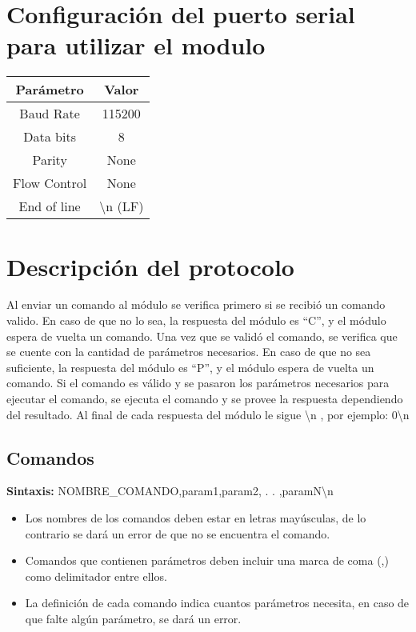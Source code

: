 \documentclass[a4paper,spanish]{article}
\title{}
\author{}
\begin{document}
\maketitle

\tableofcontents

\section{Configuración del puerto serial para utilizar el modulo}
\begin{table}[H]
	\centering
	\begin{tabular}{|c|c|}
		\hline 
		\textbf{Parámetro} & \textbf{Valor}\\ 
		\hline 
		Baud Rate & 115200\\ 
		\hline 
		Data bits & 8\\ 
		\hline 
		Parity & None \\ 
		\hline 
		Flow Control & None  \\ 
		\hline 
		End of line & \textbackslash n (LF)  \\ 
		\hline 
	\end{tabular} 
\end{table}

\section{Descripción del protocolo}
Al enviar un comando al módulo se verifica primero si se recibió un comando valido. En caso de que no lo sea, la respuesta del módulo es “C”, y el módulo espera de vuelta un comando. 
Una vez que se validó el comando, se verifica que se cuente con la cantidad de parámetros necesarios. En caso de que no sea suficiente, la respuesta del módulo es “P”, y el módulo espera de vuelta un comando. 
Si el comando es válido y se pasaron los parámetros necesarios para ejecutar el comando, se ejecuta el comando y se provee la respuesta dependiendo del resultado. 
Al final de cada respuesta del módulo le sigue \textbackslash n , por ejemplo: 0\textbackslash n

\subsection{Comandos}
\textbf{Sintaxis:} 
{\ttfamily NOMBRE\_COMANDO,param1,param2, . . ,paramN\textbackslash n}
\begin{itemize}
	\item Los nombres de los comandos deben estar en letras mayúsculas, de lo contrario se dará un error de que no se encuentra el comando.
	\item Comandos que contienen parámetros deben incluir una marca de coma (,) como delimitador entre ellos.
	\item La definición de cada comando indica cuantos parámetros necesita, en caso de que falte algún parámetro, se dará un error.
\end{itemize}
\end{document}
